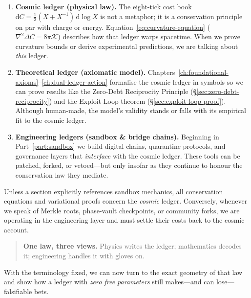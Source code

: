 \documentclass[11pt,oneside]{book}
\begin{document}
\begin{enumerate}[label=\textbf{\arabic*.},itemsep=0.3\baselineskip]
\item \textbf{Cosmic ledger (physical law).}  
      The eight-tick cost book \(\mathrm dC=\tfrac12(X+X^{-1})\,\mathrm d\log X\)
      is not a metaphor; it is a conservation principle on par with
      charge or energy.  Equation~\eqref{eq:curvature-equation}
      (\(\nabla^{2}\Delta C = 8\pi\mathcal K\)) describes how that
      ledger warps spacetime.  When we prove curvature bounds or
      derive experimental predictions, we are talking about \emph{this}
      ledger.

\item \textbf{Theoretical ledger (axiomatic model).}  
      Chapters~\ref{ch:foundational-axioms}–\ref{ch:dual-ledger-action}
      formalise the cosmic ledger in symbols so we can prove results
      like the Zero-Debt Reciprocity Principle
      (\S\ref{sec:zero-debt-reciprocity}) and the Exploit-Loop
      theorem (\S\ref{sec:exploit-loop-proof}).  Although human-made,
      the model’s validity stands or falls with its empirical fit to
      the cosmic ledger.

\item \textbf{Engineering ledgers (sandbox & bridge chains).}  
      Beginning in Part~\ref{part:sandbox} we build digital chains,
      quarantine protocols, and governance layers that
      \emph{interface} with the cosmic ledger.  These tools can be
      patched, forked, or vetoed—but only insofar as they continue to
      honour the conservation law they mediate.
\end{enumerate}

\noindent
Unless a section explicitly references sandbox mechanics, all
conservation equations and variational proofs concern the \emph{cosmic}
ledger.  Conversely, whenever we speak of Merkle roots, phase-vault
checkpoints, or community forks, we are operating in the engineering
layer and must settle their costs back to the cosmic account.

\vspace{0.5\baselineskip}
\begin{quote}
\small
\textbf{One law, three views.}  
Physics writes the ledger; mathematics decodes it; engineering handles
it with gloves on.
\end{quote}

With the terminology fixed, we can now turn to the exact geometry of
that law and show how a ledger with \emph{zero free parameters} still
makes—and can lose—falsifiable bets.
\end{document}
